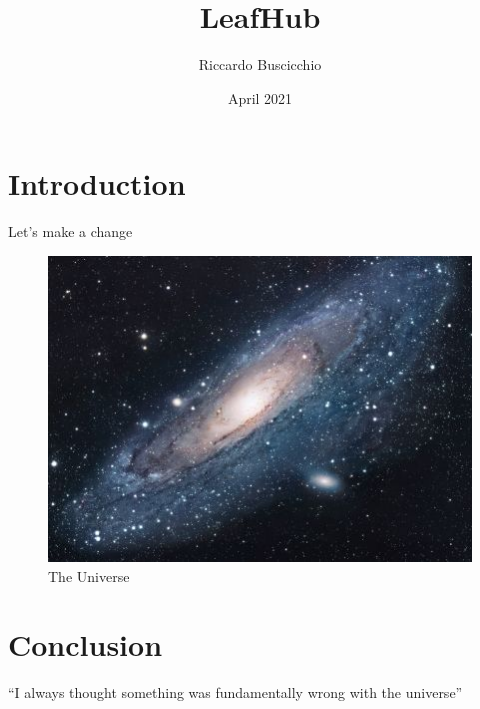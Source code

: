 \documentclass{article}
\title{LeafHub}
\author{Riccardo Buscicchio}
\date{April 2021}
\begin{document}
\maketitle

\section{Introduction}
Let's make a change

\begin{figure}[h!]
\centering
\includegraphics[scale=1.7]{universe}
\caption{The Universe}
\label{fig:universe}
\end{figure}

\section{Conclusion}
``I always thought something was fundamentally wrong with the universe'' \citep{adams1995hitchhiker}



\end{document}
